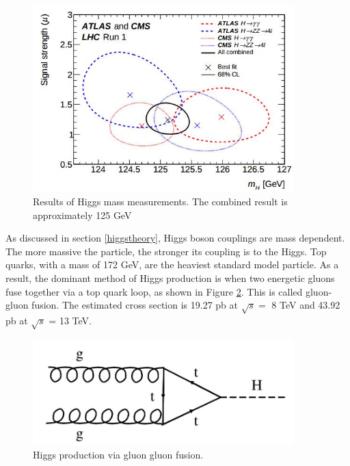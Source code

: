 \documentclass[oneside, letterpaper, oldfontcommands]{memoir}
\begin{document}
\begin{figure}[here]
\includegraphics[width=0.9\textwidth]{higgsmass.jpg}
\caption{Results of Higgs mass measurements. The combined result is approximately 125 GeV \cite{Aad:2015zhl}}
\label{fig:higgsmass}
\end{figure}

\qquad As discussed in section \ref{higgstheory}, Higgs boson couplings are mass dependent. The more massive the particle, the stronger its coupling is to the Higgs. Top quarks, with a mass of 172 GeV, are the heaviest standard model particle. As a result, the dominant method of Higgs production is when two energetic gluons fuse together via a top quark loop, as shown in Figure \ref{fig:ggfHiggs}. This is called gluon-gluon fusion. The estimated cross section is 19.27 pb at $\sqrt{s} = $ 8 TeV and 43.92 pb at $\sqrt{s}$ = 13 TeV.

\begin{figure}[here]
\includegraphics[width=0.9\textwidth]{ggfHiggs.jpg}
\caption{Higgs production via gluon gluon fusion.}
\label{fig:ggfHiggs}
\end{figure}
\end{document}
